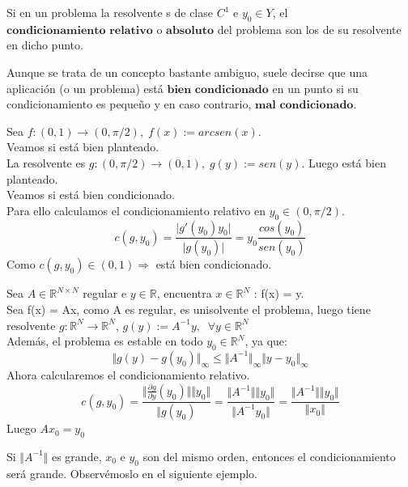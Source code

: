 \begin{ndef}
Si en un problema la resolvente s de clase $C^1$ e $y_0 \in Y$, el $\textbf{condicionamiento relativo}$ o $\textbf{absoluto}$ del problema son los de su resolvente en dicho punto.
\end{ndef}

\begin{nota}
Aunque se trata de un concepto bastante ambiguo, suele decirse que una aplicación (o un problema) está $\textbf{bien condicionado}$ en un punto si su condicionamiento es pequeño y en caso contrario, $\textbf{mal condicionado}$.
\end{nota}

\begin{ejemplo}
Sea $f : (0,1) \rightarrow (0, \pi / 2), \; f(x) := arcsen(x)$.\\
Veamos si está bien planteado.\\
La resolvente es $g : (0, \pi / 2) \rightarrow (0,1), \; g(y) := sen(y)$. Luego está bien planteado.\\
Veamos si está bien condicionado.\\ Para ello calculamos el condicionamiento relativo en $y_0 \in (0, \pi / 2)$.\\
\[ c(g,y_0) = \frac{\vert g'(y_0)y_0 \vert }{\vert g(y_0) \vert} = y_0 \frac{cos(y_0)}{sen(y_0)} \]
Como $c(g,y_0) \in (0,1) \Rightarrow$ está bien condicionado.
\end{ejemplo}

\begin{ejemplo}
Sea $A \in \mathbb{R}^{N \times N}$ regular e $y \in \mathbb{R}$, encuentra $x \in \mathbb{R}^N$ : f(x) = y.\\
Sea f(x) = Ax, como A es regular, es unisolvente el problema, luego tiene resolvente $g : \mathbb{R}^N \rightarrow \mathbb{R}^N$, $g(y) := A^{-1}y, \; \; \forall y \in \mathbb{R}^N$\\
Además, el problema es estable en todo $y_0 \in \mathbb{R}^N$, ya que:
\[ \Vert g(y) - g(y_0) \Vert _\infty \leq \Vert A^{-1} \Vert _\infty \Vert y - y_0 \Vert _\infty \]
Ahora calcularemos el condicionamiento relativo.
\[ c(g, y_0) = \frac{\Vert \frac{\partial g}{\partial y} (y_0) \Vert \Vert y_0 \Vert }{\Vert g(y_0)} = \frac{\Vert A^{-1} \Vert \Vert y_0 \Vert }{\Vert A^{-1} y_0 \Vert } = \frac{\Vert A^{-1} \Vert \Vert y_0 \Vert }{\Vert x_0 \Vert } \] 
Luego $Ax_0 = y_0$
\end{ejemplo}

Si $\Vert A^{-1} \Vert$ es grande, $x_0$ e $y_0$ son del mismo orden, entonces el condicionamiento será grande. Observémoslo en el siguiente ejemplo.

